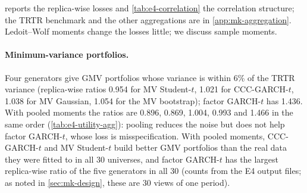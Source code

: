 \begin{table}[tbp]
  \centering
  \caption{Correlation structure of real and synthetic samples (E4). Avg.\ corr.: mean pairwise
  return correlation, mean over the 30 universes (sd across universes); synthetic values are
  means over the 20 \TRAIN{}-length replicas. Log-vol corr.: mean pairwise correlation of
  rolling 20-day log-volatilities. $\kappa$: median over universes of
  $\cond(S_{\mathrm{te}}^{-1}\hat\Sigma)$, with $\hat\Sigma$ the real \TRAIN{} covariance or that
  of a synthetic replica (median over replicas first); Kant.\ bound: the corresponding median of
  $(1+\kappa)^2/(4\kappa)$, the bound of \cref{prop:gmv-sensitivity}(b). At cap: GARCH components
  whose persistence reached the cap 0.995, out of all components (CCC-GARCH-$t$: 30 margins per
  universe; factor GARCH-$t$: factor and 30 residuals).}
  \label{tab:e4-correlation}
  \small
\end{table}

 reports the replica-wise losses and \cref{tab:e4-correlation} the
correlation structure; the TRTR benchmark and the other aggregations are in
\cref{app:mk-aggregation}. Ledoit--Wolf moments change the losses little; we discuss sample
moments.

\paragraph{Minimum-variance portfolios.}
Four generators give GMV portfolios whose \TEST{} variance is within 6\% of the TRTR variance
(replica-wise ratios 0.954 for MV Student-$t$, 1.021 for CCC-GARCH-$t$, 1.038 for MV Gaussian,
1.054 for the MV bootstrap); factor GARCH-$t$ has 1.436. With pooled moments the ratios are 0.896,
0.869, 1.004, 0.993 and 1.466 in the same order (\cref{tab:e4-utility-agg}): pooling reduces the
noise but does not help factor GARCH-$t$, whose loss is misspecification. With pooled moments,
CCC-GARCH-$t$ and MV Student-$t$ build better GMV portfolios than the real data they were fitted to
in all 30 universes, and factor GARCH-$t$ has the largest replica-wise ratio of the five generators
in all 30 (counts from the E4 output files; as noted in \cref{sec:mk-design}, these are 30 views
of one \TEST{} period).

